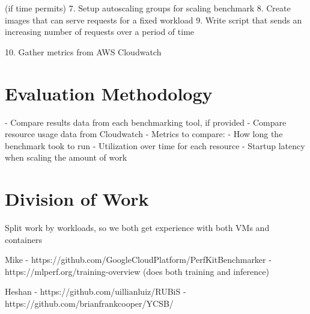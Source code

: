 \documentclass[11pt]{article}
\begin{document}
(if time permits)
7. Setup autoscaling groups for scaling benchmark
8. Create images that can serve requests for a fixed workload
9. Write script that sends an increasing number of requests over a period of time

10. Gather metrics from AWS Cloudwatch

\section{Evaluation Methodology}

- Compare results data from each benchmarking tool, if provided
- Compare resource usage data from Cloudwatch
- Metrics to compare:
  - How long the benchmark took to run
  - Utilization over time for each resource
  - Startup latency when scaling the amount of work

\section{Division of Work}

Split work by workloads, so we both get experience with both VMs and containers

Mike
  - https://github.com/GoogleCloudPlatform/PerfKitBenchmarker
  - https://mlperf.org/training-overview (does both training and inference)

Heshan
  - https://github.com/uillianluiz/RUBiS
  - https://github.com/brianfrankcooper/YCSB/
\end{document}

